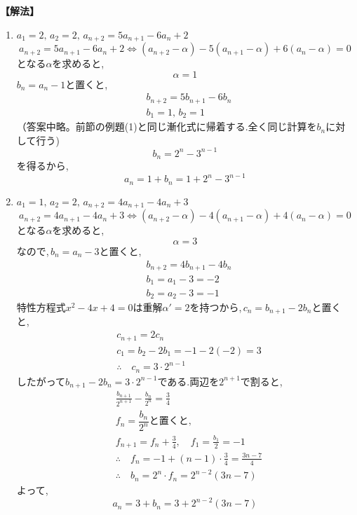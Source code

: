 \documentclass[dvipdfmx,a4paper,11pt,fleqn,openany]{jsbook}
\begin{document}
      \noindent\textbf{【解法】}
      \begin{enumerate}[label=(\arabic*),parsep=3pt]
        \item $\displaystyle a_1=2,\,a_2=2,\, a_{n+2}=5a_{n+1}-6a_n+2$
              \[
                a_{n+2}=5a_{n+1}-6a_n+2 \iff (a_{n+2}-\alpha)-5(a_{n+1}-\alpha)+6(a_n-\alpha)=0 
              \]
              となる$\alpha$を求めると,
              \[
                \alpha=1
              \]
              $b_n=a_n-1$と置くと,
              \begin{align*}
                &b_{n+2}=5b_{n+1}-6b_n\\
                &b_1=1,\, b_2=1
              \end{align*}
              （答案中略。前節の例題(1)と同じ漸化式に帰着する.全く同じ計算を$b_n$に対して行う)
              \[
                b_n=2^n-3^{n-1}
              \]
              を得るから,
              \[
                a_n=1+b_n=1+2^n-3^{n-1}
              \]
        \item $\displaystyle a_1=1,\,a_2=2,\, a_{n+2}=4a_{n+1}-4a_n+3$
              \[
                a_{n+2}=4a_{n+1}-4a_n+3 \iff (a_{n+2}-\alpha)-4(a_{n+1}-\alpha)+4(a_n-\alpha)=0 
              \]
              となる$\alpha$を求めると,
              \[
                \alpha=3
              \]
              なので,\,$b_n=a_n-3$と置くと,
              \begin{align*}
                &b_{n+2}=4b_{n+1}-4b_n\\
                &b_1=a_1-3=-2\\
                &b_2=a_2-3=-1                
              \end{align*}
              特性方程式$x^2-4x+4=0$は重解$\alpha'=2$を持つから,\,$c_n=b_{n+1}-2b_n$と置くと,
              \begin{align*}
                &c_{n+1}=2c_n\\
                &c_1=b_2-2b_1=-1-2(-2)=3\\
                &\therefore \quad c_n=3\cdot2^{n-1}
              \end{align*}
              したがって$b_{n+1}-2b_n=3\cdot2^{n-1}$である.両辺を$2^{n+1}$で割ると,
              \begin{align*}
                &\frac{b_{n+1}}{2^{n+1}}-\frac{b_n}{2^n}=\frac34\\
                &\text{$f_n=\dfrac{b_n}{2^n}$と置くと,}\\
                &f_{n+1}=f_n+\frac34,\quad f_1=\frac{b_1}{2}=-1\\
                &\therefore \quad f_n=-1+(n-1)\cdot\frac34=\frac{3n-7}{4}\\
                &\therefore \quad b_n=2^n\cdot f_n=2^{n-2}(3n-7)
              \end{align*}
              よって,
              \[
                a_n=3+b_n=3+2^{n-2}(3n-7)
              \]
      \end{enumerate}
\end{document}
